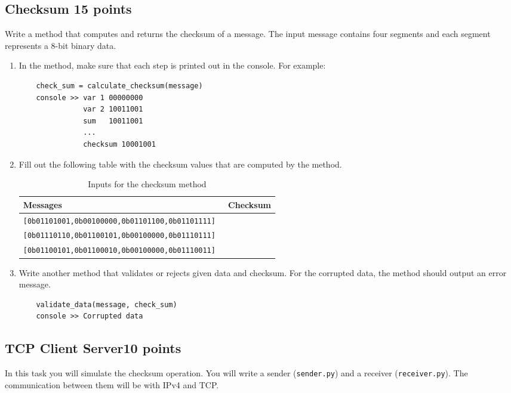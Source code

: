 \documentclass{resources/WeSTassignment}
\begin{document}
\subsection{Checksum \hfill{15 points} \label{checksum}}
Write a method that computes and returns the checksum of a message. The input message contains four segments and each segment represents a 8-bit binary data.
\begin{enumerate}
    \item In the method, make sure that each step is printed out in the console. For example:
    \begin{lstlisting}
    check_sum = calculate_checksum(message)
    console >> var 1 00000000
               var 2 10011001
               sum   10011001
               ...
               checksum 10001001
    \end{lstlisting}
    
    \item Fill out the following table with the checksum values that are computed by the method.
    \begin{table}[ht]
        \centering
        \begin{tabular}{ll}
             \textbf{Messages} & \textbf{Checksum} \\
             \hline
             \texttt{[0b01101001,0b00100000,0b01101100,0b01101111]} &  \\
             \texttt{[0b01110110,0b01100101,0b00100000,0b01110111]} &  \\
             \texttt{[0b01100101,0b01100010,0b00100000,0b01110011] } &  \\
        \end{tabular}
        \caption{Inputs for the checksum method}
        \label{tab:my_label}
    \end{table}
    
    \item Write another method that validates or rejects given data and checksum. For the corrupted data, the method should output an error message.
    
    \begin{lstlisting}
    validate_data(message, check_sum)
    console >> Corrupted data
    \end{lstlisting}
    
\end{enumerate}
\subsection{TCP Client Server\hfill{10 points}}
In this task you will simulate the checksum operation. You will write a sender (\texttt{sender.py}) and a receiver (\texttt{receiver.py}). The communication between them will be with IPv4 and TCP.  
\end{document}
